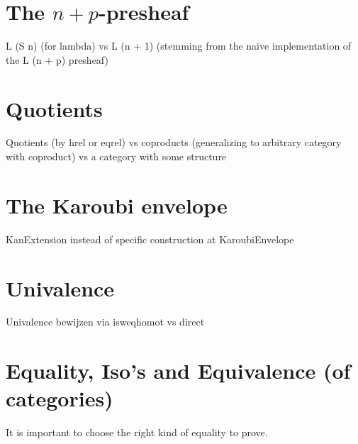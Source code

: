 \section{The \texorpdfstring{$ n + p $}{n + p}-presheaf}
L (S n) (for lambda) vs L (n + 1) (stemming from the naive implementation of the L (n + p) presheaf)

\section{Quotients}
Quotients (by hrel or eqrel) vs coproducts (generalizing to arbitrary category with coproduct) vs a category with some structure

\section{The Karoubi envelope}
KanExtension instead of specific construction at KaroubiEnvelope

\section{Univalence}
Univalence bewijzen via isweqhomot vs direct

\section{Equality, Iso's and Equivalence (of categories)}
It is important to choose the right kind of equality to prove.
